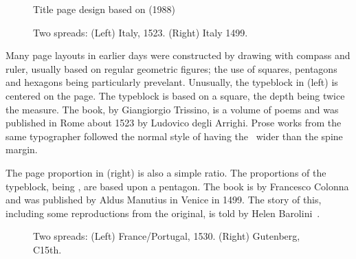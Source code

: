 \documentclass[10pt,letterpaper,extrafontsizes]{memoir}
\begin{document}
\begin{figure}
\centering
\begin{showtitle}
\titleTH
\end{showtitle}
\caption{Title page design based on  (1988)} \label{fig:titleTH}
\end{figure}


\begin{figure}
\centering
\begin{minipage}[b]{\pwlayi}
\end{minipage}
\hfill
\begin{minipage}[b]{\pwlayi}
\end{minipage}
\caption[Two spreads: Italy, 1523 and 1499]%
        {Two spreads: (Left) Italy, 1523.
         (Right) Italy 1499.} \label{fb:8}
\end{figure}

 Many page layouts in earlier days were constructed by
drawing with compass and ruler, usually based on regular geometric figures; 
the use of squares, pentagons and hexagons being particularly
prevelant. Unusually, the typeblock in  (left) 
is centered on the page. The typeblock is based on a 
square, the depth being twice the measure. The book,  by 
Giangiorgio Trissino, is a volume of poems and was published in Rome 
about 1523 by Ludovico degli Arrighi. 
Prose works
from the same typographer followed the normal style of having the \foredge\
wider than the spine margin.

    The page proportion in  (right) is also a simple 
ratio. The proportions of the typeblock, being \ratio{1.7}{1}, 
are based upon a pentagon.
The book is  by Francesco Colonna and was
published by Aldus Manutius\index{Manutius, Aldus} in Venice in 1499. 
The story of this,
including some reproductions from the original, is told by Helen
Barolini~\autocite{BAROLINI92}.


\begin{figure}
\centering
\begin{minipage}[b]{\pwlayi}
\end{minipage}
\hfill
\begin{minipage}[b]{\pwlayi}
\end{minipage}
\caption[Two spreads: France/Portugal, 1530 and Gutenberg, C15th]%
        {Two spreads: (Left) France/Portugal, 1530.
         (Right) Gutenberg, C15th.} \label{fb:9}
\end{figure}
\end{document}
